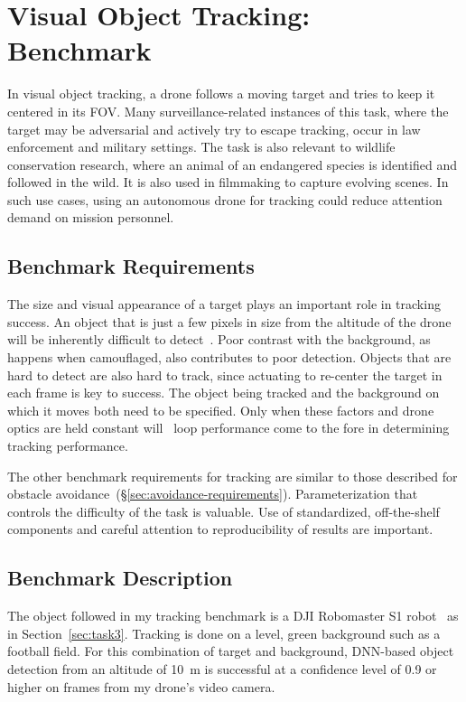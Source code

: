 \section{Visual Object Tracking: Benchmark}
\label{sec:tracking}
In visual object tracking, a drone follows a moving target and tries
to keep it centered in its FOV.  Many surveillance-related instances
of this task, where the target may be adversarial and actively try to
escape tracking, occur in law enforcement and military settings.  The
task is also relevant to wildlife conservation research, where an
animal of an endangered species is identified and followed in the
wild.  It is also used in filmmaking to capture evolving scenes.  In
such use cases, using an autonomous drone for tracking could reduce
attention demand on mission personnel.

\subsection{Benchmark Requirements}
\label{sec:tracking-requirements}

The size and visual appearance of a target plays an important role in
tracking success.  An object that is just a few pixels in size from
the altitude of the drone will be inherently difficult to
detect~\cite{Huang2017}.  Poor contrast with the background, as
happens when camouflaged, also contributes to poor detection.  Objects
that are hard to detect are also hard to track, since actuating to
re-center the target in each frame is key to success.  The object
being tracked and the background on which it moves both need to be
specified.  Only when these factors and drone optics are held
constant will \ooda~loop performance come to the fore in determining
tracking performance.

The other benchmark requirements for tracking are similar to those
described for obstacle avoidance~(\S\ref{sec:avoidance-requirements}).
Parameterization that controls the difficulty of the task is valuable.
Use of standardized, off-the-shelf components and careful attention to
reproducibility of results are important.

\subsection{Benchmark Description}
\label{sec:tracking-description}
The object followed in my tracking benchmark is a DJI Robomaster S1
robot~\cite{Robomaster2022} as in Section~\ref{sec:task3}.  Tracking is done on a level, green background such as a football field.  For this combination of target and background, DNN-based object detection from an altitude of 10~m is successful at a confidence level of 0.9 or higher on frames from my drone's video camera.

